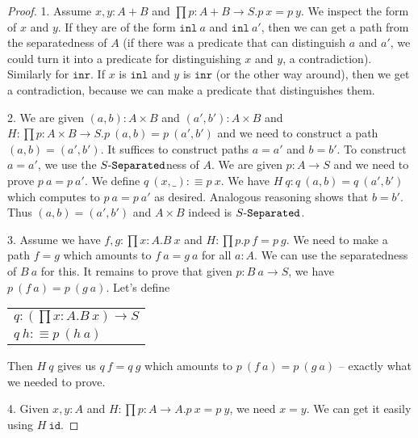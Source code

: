 \documentclass[11pt]{article}
\theoremstyle{definition}
\newcommand{\txt}[1]{\texttt{#1}}
\newcommand{\text}[1]{\texttt{#1}}
\renewcommand{\(}{\left(}
\renewcommand{\)}{\right)}
\newcommand{\defn}{:\equiv}
\newcommand{\apl}[2]{#1\ #2}
\newcommand{\id}{\text{id}}
\newcommand{\dprod}[2]{\prod #1.#2}
\newcommand{\prodt}[2]{#1 \times #2}
\newcommand{\inl}{\txt{inl}}
\newcommand{\inr}{\txt{inr}}
\begin{document}
\begin{proof}
1. Assume $x, y : A + B$ and $\dprod{p : A + B \to S}{\apl{p}{x} = \apl{p}{y}}$. We inspect the form of $x$ and $y$. If they are of the form $\apl{\inl}{a}$ and $\apl{\inl}{a'}$, then we can get a path from the separatedness of $A$ (if there was a predicate that can distinguish $a$ and $a'$, we could turn it into a predicate for distinguishing $x$ and $y$, a contradiction). Similarly for $\inr$. If $x$ is $\inl$ and $y$ is $\inr$ (or the other way around), then we get a contradiction, because we can make a predicate that distinguishes them.

2. We are given $(a, b) : \prodt{A}{B}$ and $(a', b') : \prodt{A}{B}$ and $H : \dprod{p : \prodt{A}{B} \to S}{\apl{p}{(a, b)} = \apl{p}{(a', b')}}$ and we need to construct a path $(a, b) = (a', b')$. It suffices to construct paths $a = a'$ and $b = b'$. To construct $a = a'$, we use the $\Separated{S}$ness of $A$. We are given $p : A \to S$ and we need to prove $\apl{p}{a} = \apl{p}{a'}$. We define $\apl{q}{(x, \_)} \defn \apl{p}{x}$. We have $\apl{H}{q} : \apl{q}{(a, b)} = \apl{q}{(a', b')}$ which computes to $\apl{p}{a} = \apl{p}{a'}$ as desired. Analogous reasoning shows that $b = b'$. Thus $(a, b) = (a', b')$ and $\prodt{A}{B}$ indeed is $\Separated{S}$.

3. Assume we have $f, g : \dprod{x : A}{\apl{B}{x}}$ and $H : \dprod{p}{\apl{p}{f} = \apl{p}{g}}$. We need to make a path $f = g$ which amounts to $\apl{f}{a} = \apl{g}{a}$ for all $a : A$. We can use the separatedness of $\apl{B}{a}$ for this. It remains to prove that given $p : \apl{B}{a} \to S$, we have $\apl{p}{(\apl{f}{a})} = \apl{p}{(\apl{g}{a})}$. Let's define \\

\begin{center}
\begin{tabular}{l}
$q : \(\dprod{x : A}{\apl{B}{x}}\) \to S$ \\
$\apl{q}{h} \defn \apl{p}{(\apl{h}{a})}$
\end{tabular}
\end{center}

Then $\apl{H}{q}$ gives us $\apl{q}{f} = \apl{q}{g}$ which amounts to $\apl{p}{(\apl{f}{a})} = \apl{p}{(\apl{g}{a})}$ -- exactly what we needed to prove.

4. Given $x, y : A$ and $H : \dprod{p : A \to A}{\apl{p}{x} = \apl{p}{y}}$, we need $x = y$. We can get it easily using $\apl{H}{\id}$.
\end{proof}
\end{document}
